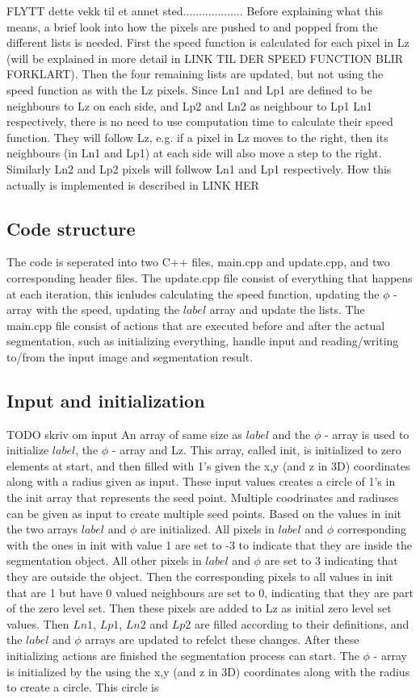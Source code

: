 FLYTT dette vekk til et annet sted...................
Before explaining what this means, a brief look into how the pixels are pushed to and popped from the different lists is needed. First the speed function is calculated for each pixel in Lz (will be explained in more detail in LINK TIL DER SPEED FUNCTION BLIR FORKLART). Then the four remaining lists are updated, but not using the speed function as with the Lz pixels. Since Ln1 and Lp1 are defined to be neighbours to Lz on each side, and Lp2 and Ln2 as neighbour to Lp1 Ln1 respectively, there is no need to use computation time to calculate their speed function. They will follow Lz, e.g. if a pixel in Lz moves to the right, then its neighbours (in Ln1 and Lp1) at each side will also move a step to the right. Similarly Ln2 and Lp2 pixels will follwow Ln1 and Lp1 respectively. How this actually is implemented is described in LINK HER

\subsection{Code structure}
The code is seperated into two C++ files, main.cpp and update.cpp, and two corresponding header files. The update.cpp file consist of everything that happens at each iteration, this icnludes calculating the speed function, updating the $\phi$ - array with the speed, updating the $label$ array and update the lists. The main.cpp file consist of actions that are executed before and after the actual segmentation, such as initializing everything, handle input and reading/writing to/from the input image and segmentation result. 

\subsection{Input and initialization}
TODO skriv om input
An array of same size as $label$ and the $\phi$ - array is used to initialize $label$, the $\phi$ - array and Lz. This array, called init, is initialized to zero elements at start, and then filled with 1's given the x,y (and z in 3D) coordinates along with a radius given as input. These input values creates a circle of 1's in the init array that represents the seed point. Multiple coodrinates and radiuses can be given as input to create multiple seed points. Based on the values in init the two arrays $label$ and $\phi$ are initialized. All pixels in $label$ and $\phi$ corresponding with the ones in init with value 1 are set to -3 to indicate that they are inside the segmentation object. All other pixels in $label$ and $\phi$ are set to 3 indicating that they are outside the object. Then the corresponding pixels to all values in init that are 1 but have 0 valued neighbours are set to 0, indicating that they are part of the zero level set. Then these pixels are added to Lz as initial zero level set values. Then $Ln1$, $Lp1$, $Ln2$ and $Lp2$ are filled according to their definitions, and the $label$ and $\phi$ arrays are updated to refelct these changes. After these initializing actions are finished the segmentation process can start.
The $\phi$ - array is initialized by the using the x,y (and z in 3D) coordinates along with the radius to create a circle. This circle is 

